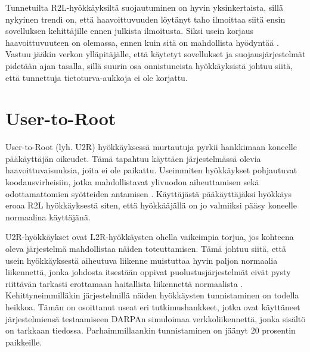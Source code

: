 Tunnetuilta R2L-hyökkäyksiltä suojautuminen on hyvin yksinkertaista, sillä
nykyinen trendi on, että haavoittuvuuden löytänyt taho ilmoittaa siitä ensin
sovelluksen kehittäjille ennen julkista ilmoitusta. Siksi usein korjaus
haavoittuvuuteen on olemassa, ennen kuin sitä on mahdollista hyödyntää \cite{IDSb}.
Vastuu jääkin verkon ylläpitäjälle, että käytetyt sovellukset ja 
suojausjärjestelmät pidetään ajan tasalla, sillä suurin osa onnistuneista hyökkäyksistä 
johtuu siitä, että tunnettuja tietoturva-aukkoja ei ole korjattu.

\section{User-to-Root}

User-to-Root (lyh. U2R) hyökkäyksessä murtautuja pyrkii hankkimaan
koneelle pääkäyttäjän oikeudet. Tämä tapahtuu käyttäen järjestelmässä
olevia haavoittuvaisuuksia, joita ei ole paikattu. Useimmiten
hyökkäykset pohjautuvat koodausvirheisiin, jotka mahdollistavat
ylivuodon aiheuttamisen sekä odottamattomien syötteiden antamisen
\cite{IDS}. Käyttäjästä pääkäyttäjäksi hyökkäys eroaa R2L hyökkäyksestä
siten, että hyökkääjällä on jo valmiiksi pääsy koneelle normaalina
käyttäjänä.

U2R-hyökkäykset ovat L2R-hyökkäysten ohella vaikeimpia torjua, jos kohteena
oleva järjestelmä mahdollistaa näiden toteuttamisen. Tämä johtuu siitä, että
usein hyökkäyksestä aiheutuva liikenne muistuttaa hyvin paljon normaalia
liikennettä, jonka johdosta itsestään oppivat puolustusjärjestelmät eivät pysty
riittävän tarkasti erottamaan haitallista liikennettä normaalista \cite{U2R}.
Kehittyneimmilläkin järjestelmillä näiden hyökkäysten tunnistaminen on todella
heikkoa. Tämän on osoittanut useat eri tutkimushankkeet, jotka ovat käyttäneet
järjestelmiensä testaamiseen DARPAn simuloimaa verkkoliikennettä, jonka sisältö
on tarkkaan tiedossa. Parhaimmillaankin tunnistaminen on jäänyt 20 prosentin
paikkeille.
